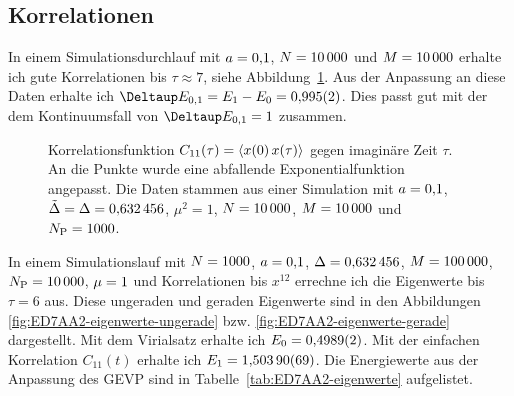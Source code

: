 \subsection{Korrelationen}

In einem Simulationsdurchlauf mit $a = \num{0.1}$, $N =
\num{10000}$ und $M = \num{10000}$ erhalte ich gute Korrelationen bis
$\tau \approx \num{7}$, siehe Abbildung~\ref{fig:84DAA2-correlation}. Aus der
Anpassung an diese Daten erhalte ich $\Deltaup E_{0,1} = E_1 - E_0 = \num{0.995
    +- 0.002}$. Dies passt gut mit der dem Kontinuumsfall von $\Deltaup E_{0,1}
    = \num{1}$ zusammen.

\begin{figure}[htbp]
    \centering
    \caption{%
        Korrelationsfunktion $C_{11}(\tau) = \langle x(0) \, x(\tau) \rangle$ gegen
        imaginäre Zeit $\tau$. An die Punkte wurde eine abfallende
        Exponentialfunktion angepasst. Die Daten stammen aus einer Simulation
        mit $a = \num{0.1}$, $\tilde \Delta = \Delta =
        \num{0.632456}$, $\mu^2 = \num{1}$, $N = \num{10000}$,
        $M = \num{10000}$ und $N_\text P = \num{1000}$.
    }
    \label{fig:84DAA2-correlation}
\end{figure}


In einem Simulationslauf mit $N = \num{1000}$, $a =
\num{0.1}$, $\Delta = \num{0.632456}$, $M = \num{100000}$,
$N_\text P = \num{10000}$, $\mu = \num{1}$ und Korrelationen bis
$x^{12}$ errechne ich die Eigenwerte bis $\tau = \num{6}$ aus. Diese ungeraden
und geraden Eigenwerte sind in den Abbildungen
\ref{fig:ED7AA2-eigenwerte-ungerade} bzw. \ref{fig:ED7AA2-eigenwerte-gerade}
dargestellt. Mit dem Virialsatz erhalte ich $E_0 = \num{0.4989 +- 0.0002}$. Mit
der einfachen Korrelation $C_{11}(t)$ erhalte ich $E_1 = \num{1.50390 +- 0.00069}$. Die Energiewerte aus der Anpassung des GEVP sind in
Tabelle~\ref{tab:ED7AA2-eigenwerte} aufgelistet.

